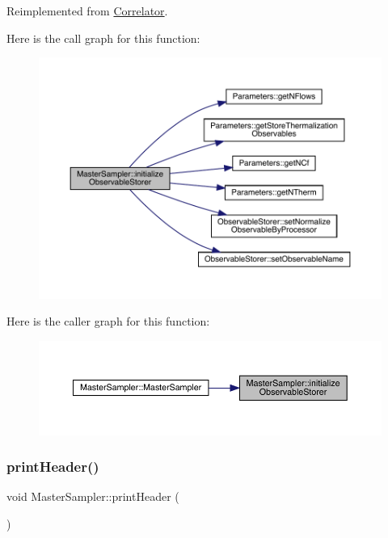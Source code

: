 Reimplemented from \mbox{\hyperlink{class_correlator_ab99886c09dd27dfc8676d0032cecf9bc}{Correlator}}.

Here is the call graph for this function\+:\nopagebreak
\begin{figure}[H]
\begin{center}
\leavevmode
\includegraphics[width=350pt]{class_master_sampler_a88e2eec68ea6bd60cc3f375ac04a8ded_cgraph}
\end{center}
\end{figure}
Here is the caller graph for this function\+:\nopagebreak
\begin{figure}[H]
\begin{center}
\leavevmode
\includegraphics[width=350pt]{class_master_sampler_a88e2eec68ea6bd60cc3f375ac04a8ded_icgraph}
\end{center}
\end{figure}
\mbox{\label{class_master_sampler_a51b207672764c100e1ae258fd2e33fcf}} 
\subsubsection{\texorpdfstring{printHeader()}{printHeader()}}
{\footnotesize\ttfamily void Master\+Sampler\+::print\+Header (\begin{DoxyParamCaption}{ }\end{DoxyParamCaption})\hspace{0.3cm}{\ttfamily [virtual]}}



